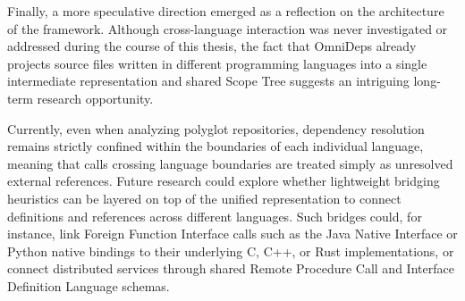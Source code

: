 Finally, a more speculative direction emerged as a reflection on
the architecture of the framework. Although cross-language interaction was
never investigated or addressed during the course of this thesis, the fact that
OmniDeps already projects source files written in different programming
languages into a single intermediate representation and shared Scope Tree
suggests an intriguing long-term research opportunity.

Currently, even when analyzing polyglot repositories, dependency resolution
remains strictly confined within the boundaries of each individual language,
meaning that calls crossing language boundaries are treated simply as unresolved
external references. Future research could explore whether lightweight bridging
heuristics can be layered on top of the unified representation to connect
definitions and references across different languages. Such bridges could, for
instance, link Foreign Function Interface calls such as the Java Native
Interface or Python native bindings to their underlying C, C++, or Rust
implementations, or connect distributed services through shared Remote Procedure
Call and Interface Definition Language schemas.
